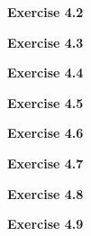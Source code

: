 \documentclass{article}
\begin{document}
\begin{framed}
    \noindent \textbf{Exercise 4.2}
    
    \medskip
    
    
\end{framed}


\bigskip

\begin{framed}
    \noindent \textbf{Exercise 4.3}
    
    \medskip
    
    
\end{framed}


\bigskip

\begin{framed}
    \noindent \textbf{Exercise 4.4}
    
    \medskip
    
    
\end{framed}


\bigskip

\begin{framed}
    \noindent \textbf{Exercise 4.5}
    
    \medskip
    
    
\end{framed}


\bigskip

\begin{framed}
    \noindent \textbf{Exercise 4.6}
    
    \medskip
    
    
\end{framed}


\bigskip

\begin{framed}
    \noindent \textbf{Exercise 4.7}
    
    \medskip
    
    
\end{framed}


\bigskip

\begin{framed}
    \noindent \textbf{Exercise 4.8}
    
    \medskip
    
    
\end{framed}


\bigskip

\begin{framed}
    \noindent \textbf{Exercise 4.9}
    
    \medskip
    
    
\end{framed}
\end{document}
